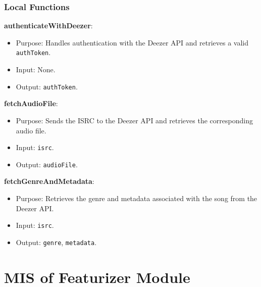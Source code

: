 \documentclass[12pt, titlepage]{article}
\begin{document}
\subsubsection{Local Functions}

\textbf{authenticateWithDeezer}:
\begin{itemize}
\item Purpose: Handles authentication with the Deezer API and retrieves a valid \texttt{authToken}.
\item Input: None.
\item Output: \texttt{authToken}.
\end{itemize}

\textbf{fetchAudioFile}:
\begin{itemize}
\item Purpose: Sends the ISRC to the Deezer API and retrieves the corresponding audio file.
\item Input: \texttt{isrc}.
\item Output: \texttt{audioFile}.
\end{itemize}

\textbf{fetchGenreAndMetadata}:
\begin{itemize}
\item Purpose: Retrieves the genre and metadata associated with the song from the Deezer API.
\item Input: \texttt{isrc}.
\item Output: \texttt{genre}, \texttt{metadata}.
\end{itemize}

\section{MIS of Featurizer Module}
\end{document}
